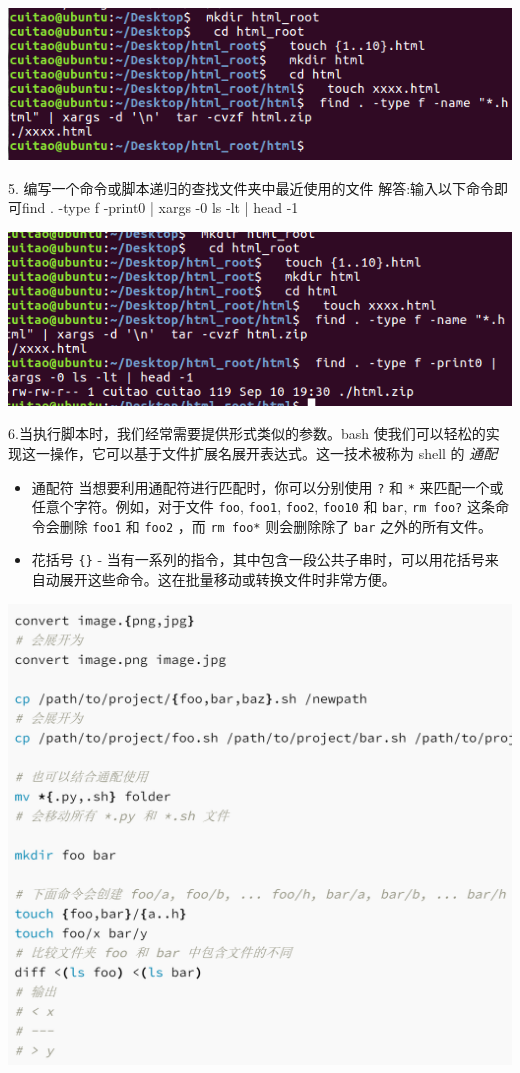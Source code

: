 \documentclass{article}
\begin{document}
\noindent
\begin{minipage}{\linewidth}
 \centering
  \includegraphics[width=0.5\linewidth]{Shell4.png}
  \label{fig:example}
\end{minipage}

5.
编写一个命令或脚本递归的查找文件夹中最近使用的文件 \newline
解答:输入以下命令即可\newline find . -type f -print0 | xargs -0 ls -lt | head -1\newline
\noindent
\begin{minipage}{\linewidth}
 \centering
  \includegraphics[width=0.5\linewidth]{Shell5.png}
  \label{fig:example}
\end{minipage}

6.当执行脚本时，我们经常需要提供形式类似的参数。bash 使我们可以轻松的实现这一操作，它可以基于文件扩展名展开表达式。这一技术被称为 shell 的 \textit{通配}
\begin{itemize}
    \item 通配符 当想要利用通配符进行匹配时，你可以分别使用 \verb|?| 和 \verb|*| 来匹配一个或任意个字符。例如，对于文件 \verb|foo|, \verb|foo1|, \verb|foo2|, \verb|foo10| 和 \verb|bar|, \verb|rm foo?| 这条命令会删除 \verb|foo1| 和 \verb|foo2| ，而 \verb|rm foo*| 则会删除除了 \verb|bar| 之外的所有文件。
    \item 花括号 \verb|{}| - 当有一系列的指令，其中包含一段公共子串时，可以用花括号来自动展开这些命令。这在批量移动或转换文件时非常方便。
\end{itemize}
 

\noindent
\begin{minipage}{\linewidth}
 \centering
  \includegraphics[width=0.5\linewidth]{Shell6.png}
  \label{fig:example}
\end{minipage}
\end{document}
